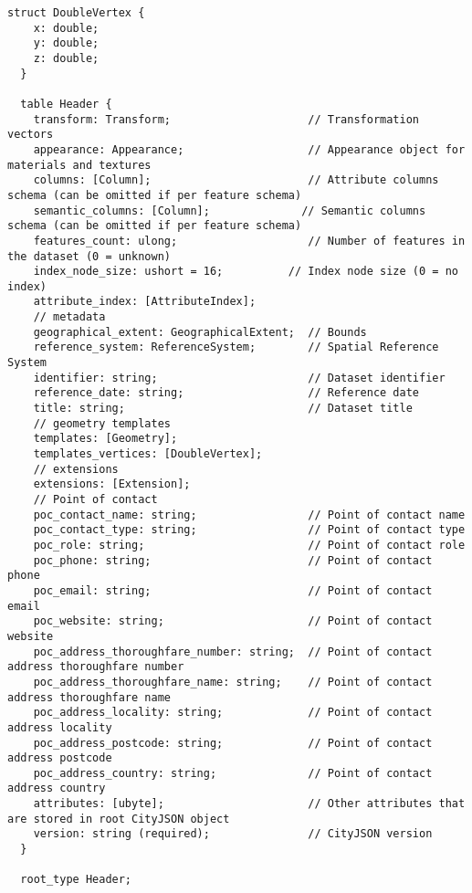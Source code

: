 \begin{lstlisting}[caption={Header schema of FlatCityBuf},  basicstyle=\small]
  struct DoubleVertex {
    x: double;
    y: double;
    z: double;
  }

  table Header {
    transform: Transform;                     // Transformation vectors
    appearance: Appearance;                   // Appearance object for materials and textures
    columns: [Column];                        // Attribute columns schema (can be omitted if per feature schema)
    semantic_columns: [Column];              // Semantic columns schema (can be omitted if per feature schema)
    features_count: ulong;                    // Number of features in the dataset (0 = unknown)
    index_node_size: ushort = 16;          // Index node size (0 = no index)
    attribute_index: [AttributeIndex];
    // metadata
    geographical_extent: GeographicalExtent;  // Bounds
    reference_system: ReferenceSystem;        // Spatial Reference System
    identifier: string;                       // Dataset identifier
    reference_date: string;                   // Reference date
    title: string;                            // Dataset title
    // geometry templates
    templates: [Geometry];
    templates_vertices: [DoubleVertex];
    // extensions
    extensions: [Extension];
    // Point of contact
    poc_contact_name: string;                 // Point of contact name
    poc_contact_type: string;                 // Point of contact type
    poc_role: string;                         // Point of contact role
    poc_phone: string;                        // Point of contact phone
    poc_email: string;                        // Point of contact email
    poc_website: string;                      // Point of contact website
    poc_address_thoroughfare_number: string;  // Point of contact address thoroughfare number
    poc_address_thoroughfare_name: string;    // Point of contact address thoroughfare name
    poc_address_locality: string;             // Point of contact address locality
    poc_address_postcode: string;             // Point of contact address postcode
    poc_address_country: string;              // Point of contact address country
    attributes: [ubyte];                      // Other attributes that are stored in root CityJSON object
    version: string (required);               // CityJSON version
  }

  root_type Header;
\end{lstlisting}

